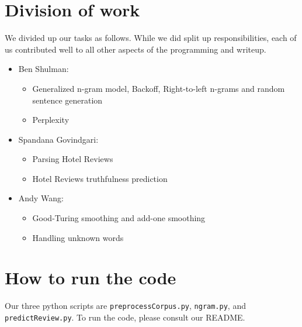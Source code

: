 \documentclass{article}
\begin{document}
\section{Division of work}
We divided up our tasks as follows. While we did split up responsibilities, each of us contributed well to all other aspects of the programming and writeup.

\begin{itemize}[noitemsep]
\item Ben Shulman:
  \begin{itemize}[noitemsep,nolistsep]
  \item Generalized n-gram model, Backoff, Right-to-left n-grams and random sentence generation
  \item Perplexity
  \end{itemize}
\item Spandana Govindgari:
  \begin{itemize}[noitemsep,nolistsep]
  \item Parsing Hotel Reviews
  \item Hotel Reviews truthfulness prediction
  \end{itemize}
\item Andy Wang:
  \begin{itemize}[noitemsep,nolistsep]
  \item Good-Turing smoothing and add-one smoothing
  \item Handling unknown words
  \end{itemize}
\end{itemize}

\section{How to run the code} %
Our three python scripts are \texttt{preprocessCorpus.py}, \texttt{ngram.py}, and \texttt{predictReview.py}. To run the code, please consult our README.
\end{document}
